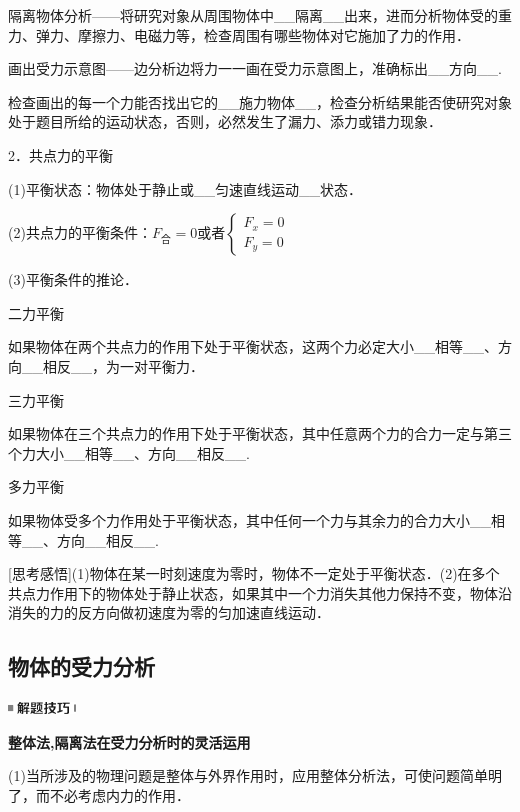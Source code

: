 隔离物体分析------将研究对象从周围物体中\_\_隔离\_\_出来，进而分析物体受的重力、弹力、摩擦力、电磁力等，检查周围有哪些物体对它施加了力的作用．

画出受力示意图------边分析边将力一一画在受力示意图上，准确标出\_\_方向\_\_.

检查画出的每一个力能否找出它的\_\_施力物体\_\_，检查分析结果能否使研究对象处于题目所给的运动状态，否则，必然发生了漏力、添力或错力现象．

2．共点力的平衡

(1)平衡状态：物体处于静止或\_\_匀速直线运动\_\_状态．

(2)共点力的平衡条件：$F_{\text{合}}=0$或者$\left\{\begin{array}{l}F_{x}=0 \\ F_{y}=0\end{array}\right.$

(3)平衡条件的推论．

二力平衡

如果物体在两个共点力的作用下处于平衡状态，这两个力必定大小\_\_相等\_\_、方向\_\_相反\_\_，为一对平衡力．

三力平衡

如果物体在三个共点力的作用下处于平衡状态，其中任意两个力的合力一定与第三个力大小\_\_相等\_\_、方向\_\_相反\_\_.

多力平衡

如果物体受多个力作用处于平衡状态，其中任何一个力与其余力的合力大小\_\_相等\_\_、方向\_\_相反\_\_.

{[}思考感悟{]}(1)物体在某一时刻速度为零时，物体不一定处于平衡状态．(2)在多个共点力作用下的物体处于静止状态，如果其中一个力消失其他力保持不变，物体沿消失的力的反方向做初速度为零的匀加速直线运动．
\newpage
\subsection{物体的受力分析}

\begin{center}\includegraphics[width=0.70833in,height=0.125in]{media/image37.png}\end{center}
\begin{center}
	\textbf{整体法,隔离法在受力分析时的灵活运用}
\end{center}

(1)当所涉及的物理问题是整体与外界作用时，应用整体分析法，可使问题简单明了，而不必考虑内力的作用．

